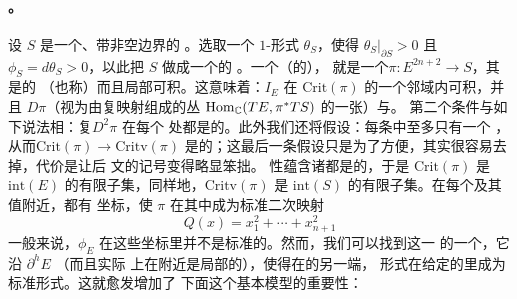 \paragraph{\trLefschetzFibration{}。}\label{sub:lefschetz-fibrations}
设 $S$ 是一个\trConnected\trCompact、带非空边界的\trRiemann%
\trSurface。选取一个 $1$-形式 $\theta_S$，使得 $\theta_S|_{\partial S}>0$ 且
$\phi_S=d\theta_S>0$，以此把 $S$ 做成一个\trCorneredBoundary{}的%
\trExactSymplectic\trManifold。一个（\trExact{}的）\trLefschetzFibration，
就是一个\trFibrationWithSingularities{}$\pi\colon E^{2n+2}\to S$，其\trCriticalPoint{}是\trGeneric{}的
（也称\trNondegenerate）而且局部可积。这意味着：$I_E$ 在 $\mathrm{Crit}(\pi)$
的一个邻域内可积，并且 $D\pi$（视为由复\trLinear{}映射组成的丛
$\operatorname{Hom}_{\mathbb{C}}(TE,\pi^*TS)$ 的一张\trSection）与\trZeroSection{}\trTransverse。
第二个条件与如下说法相\trEquivalence：复\trHessian{}$D^2\pi$ 在每个%
\trCriticalPoint{}处都是\trNondegenerate{}的。此外我们还将假设：每条\trFiber{}中至多只有一个%
\trCriticalPoint，从而\trProjection{}$\mathrm{Crit}(\pi)\to\mathrm{Critv}(\pi)$
是\trBijective{}的；这最后一条假设只是为了方便，其实很容易去掉，代价是让后
文的记号变得略显笨拙。
\trNondegenerate{}性蕴含诸\trCriticalPoint{}都是\trIsolated{}的，于是
$\mathrm{Crit}(\pi)$ 是 $\mathrm{int}(E)$ 的有限子集，同样地，$\mathrm{Critv}(\pi)$
是 $\mathrm{int}(S)$ 的有限子集。在每个\trCriticalPoint{}及其值附近，都有%
\trHolomorphic{}坐标，使 $\pi$ 在其中成为标准二次映射
\begin{equation}\label{eq:standard-quadratic-map}
Q(x)=x_1^2+\cdots+x_{n+1}^2
\end{equation}
一般来说，$\phi_E$ 在这些坐标里并不是标准的。然而，我们可以找到这一%
\trFibration{}的一个\trDeformation，它沿 $\partial^h E$ \trWellBehaved{}（而且实际
上在\trCriticalPoint{}附近是局部的），使得在\trDeformation{}的另一端，
\trKaehler{}形式在给定的\trHolomorphic\trMorse\trChart{}里成为标准形式。这就愈发增加了
下面这个基本模型的重要性：
